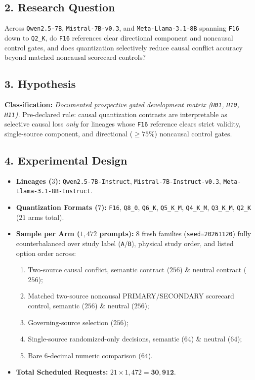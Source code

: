 \subsection*{2. Research Question}
Across \texttt{Qwen2.5-7B}, \texttt{Mistral-7B-v0.3}, and \texttt{Meta-Llama-3.1-8B} spanning \texttt{F16} down to \texttt{Q2\_K}, do \texttt{F16} references clear directional component and noncausal control gates, and does quantization selectively reduce causal conflict accuracy beyond matched noncausal scorecard controls?

\subsection*{3. Hypothesis}
\textbf{Classification:} \emph{Documented prospective gated development matrix (\texttt{H01}, \texttt{H10}, \texttt{H11}).} Pre-declared rule: causal quantization contrasts are interpretable as selective causal loss \emph{only} for lineages whose \texttt{F16} reference clears strict validity, single-source component, and directional ($\ge 75\%$) noncausal control gates.

\subsection*{4. Experimental Design}
\begin{itemize}
  \item \textbf{Lineages ($3$):} \texttt{Qwen2.5-7B-Instruct}, \texttt{Mistral-7B-Instruct-v0.3}, \texttt{Meta-Llama-3.1-8B-Instruct}.
  \item \textbf{Quantization Formats ($7$):} \texttt{F16}, \texttt{Q8\_0}, \texttt{Q6\_K}, \texttt{Q5\_K\_M}, \texttt{Q4\_K\_M}, \texttt{Q3\_K\_M}, \texttt{Q2\_K} ($21$ arms total).
  \item \textbf{Sample per Arm ($1{,}472$ prompts):} $8$ fresh families (\texttt{seed=20261120}) fully counterbalanced over study label (\texttt{A}/\texttt{B}), physical study order, and listed option order across:
    \begin{enumerate}
      \item Two-source causal conflict, semantic contract ($256$) \& neutral contract ($256$);
      \item Matched two-source noncausal PRIMARY/SECONDARY scorecard control, semantic ($256$) \& neutral ($256$);
      \item Governing-source selection ($256$);
      \item Single-source randomized-only decisions, semantic ($64$) \& neutral ($64$);
      \item Bare 6-decimal numeric comparison ($64$).
    \end{enumerate}
  \item \textbf{Total Scheduled Requests:} $21 \times 1{,}472 = \mathbf{30{,}912}$.
\end{itemize}

